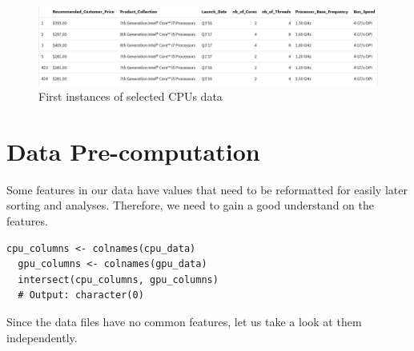 \begin{figure}[!ht]
  \centering
  \includegraphics[width=\textwidth]{img/cpu-selected-head.png}
  \vspace{0.5cm}
  \caption{First instances of selected CPUs data}
\end{figure}

\section{Data Pre-computation}

Some features in our data have values that need to be reformatted for easily later sorting and analyses. Therefore, we need to gain a good understand on the features.


\begin{lstlisting}[caption={A processing for selected features}]
  cpu_columns <- colnames(cpu_data)
  gpu_columns <- colnames(gpu_data)
  intersect(cpu_columns, gpu_columns)
  # Output: character(0)
\end{lstlisting}

Since the data files have no common features, let us take a look at them independently.